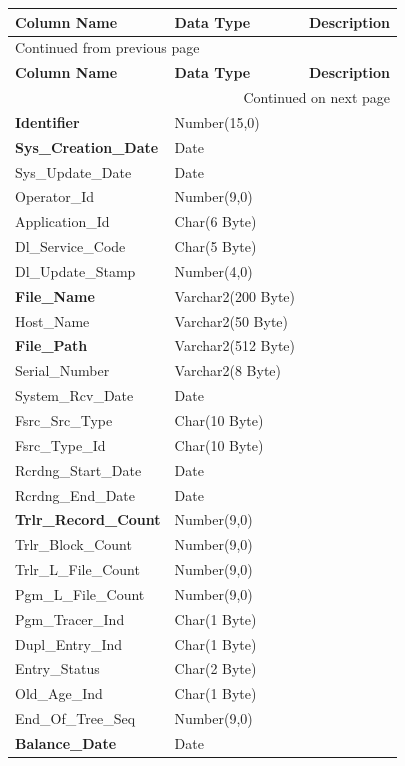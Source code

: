 \documentclass[12pt,twoside]{article}
\begin{document}
\begin{longtable}{l|l|l}
\hline
\textbf{Column Name} & \textbf{Data Type} & \textbf{Description}\\
\hline
\endfirsthead
\multicolumn{3}{l}{Continued from previous page} \\
\hline

\textbf{Column Name} & \textbf{Data Type} & \textbf{Description} \\

\hline
\endhead
\hline\multicolumn{3}{r}{Continued on next page} \\
\endfoot
\endlastfoot
\hline
\textbf{Identifier} & Number(15,0) & \\
\textbf{Sys\_Creation\_Date} & Date & \\
Sys\_Update\_Date & Date & \\
Operator\_Id & Number(9,0) & \\
Application\_Id & Char(6 Byte) & \\
Dl\_Service\_Code & Char(5 Byte) & \\
Dl\_Update\_Stamp & Number(4,0) & \\
\textbf{File\_Name} & Varchar2(200 Byte) & \\
Host\_Name & Varchar2(50 Byte) & \\
\textbf{File\_Path} & Varchar2(512 Byte) & \\
Serial\_Number & Varchar2(8 Byte) & \\
System\_Rcv\_Date & Date & \\
Fsrc\_Src\_Type & Char(10 Byte) & \\
Fsrc\_Type\_Id & Char(10 Byte) & \\
Rcrdng\_Start\_Date & Date & \\
Rcrdng\_End\_Date & Date & \\
\textbf{Trlr\_Record\_Count} & Number(9,0) & \\
Trlr\_Block\_Count & Number(9,0) & \\
Trlr\_L\_File\_Count & Number(9,0) & \\
Pgm\_L\_File\_Count & Number(9,0) & \\
Pgm\_Tracer\_Ind & Char(1 Byte) & \\
Dupl\_Entry\_Ind & Char(1 Byte) & \\
Entry\_Status & Char(2 Byte) & \\
Old\_Age\_Ind & Char(1 Byte) & \\
End\_Of\_Tree\_Seq & Number(9,0) & \\
\textbf{Balance\_Date} & Date & \\
\hline
\end{longtable}
\normalsize
\end{document}
